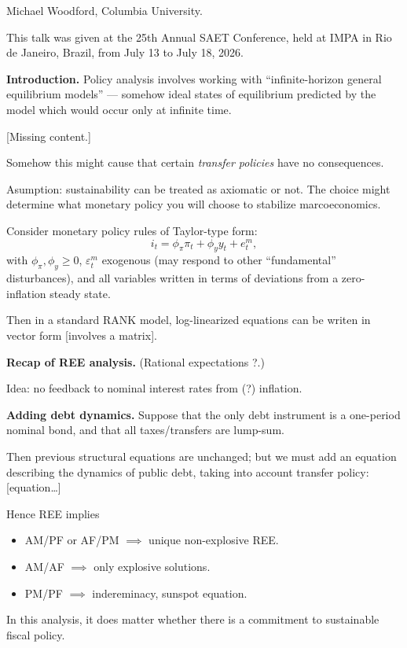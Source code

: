 \medskip\noindent
Michael Woodford,
Columbia University.

\medskip\noindent
This talk was given at the 25th Annual
SAET Conference, held at IMPA in Rio de
Janeiro, Brazil, from July 13 to
July 18, 2026.

\medskip\noindent
{\bf Introduction.} Policy analysis involves
working with ``infinite-horizon general
equilibrium models'' --- somehow ideal
states of equilibrium predicted by the model
which would occur only at infinite time.

[Missing content.]

Somehow this might cause that certain
{\it transfer policies} have no
consequences.

Asumption: sustainability can be treated as
axiomatic or not. The choice might determine
what monetary policy you will choose
to stabilize marcoeconomics.

Consider monetary policy rules of
Taylor-type form:
$$
i_t=\phi_\pi \pi_t + \phi_y y_t+
e^m_t,
$$
with $\phi_\pi,\phi_y \geq  0$,
$\varepsilon_t^m$ exogenous (may respond to
other ``fundamental'' disturbances),
and all variables written in terms of
deviations from a zero-inflation steady
state.

Then in a standard RANK model,
log-linearized equations can be writen in
vector form [involves a matrix].

\medskip\noindent
{\bf Recap of REE analysis.}
(Rational expectations ?.)

Idea: no feedback to nominal interest rates
from (?) inflation.

\medskip\noindent
{\bf Adding debt dynamics.}
Suppose that the only debt instrument is a
one-period nominal bond, and that all
taxes/transfers are lump-sum.

Then previous structural equations are
unchanged; but we must add an equation
describing the dynamics of public debt,
taking into account transfer policy:
[equation…]

\medskip\noindent
{\bf }
Hence REE implies
\begin{itemize}
\item AM/PF or AF/PM $\implies $ unique
non-explosive REE.
\item AM/AF $\implies$ only explosive
solutions.
\item PM/PF $\implies$ indereminacy, sunspot
equation.
\end{itemize}

\noindent
In this analysis, it does matter
whether there is a commitment to sustainable
fiscal policy.

